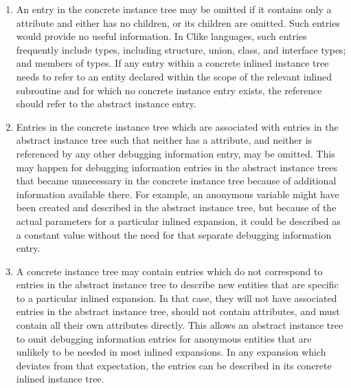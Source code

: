 \begin{enumerate}[1. ]
\item An entry in the concrete instance tree may be omitted if
it contains only a 
 attribute and either
has no children, or its children are omitted. Such entries
would provide no useful information. In C\dash like languages,
such entries frequently include types, including structure,
union, class, and interface types; and members of types. If any
entry within a concrete inlined instance tree needs to refer
to an entity declared within the scope of the relevant inlined
subroutine and for which no concrete instance entry exists,
the reference should refer to the abstract instance entry.

\item Entries in the concrete instance tree which are associated
with entries in the abstract instance tree such that neither
has a  attribute,
and neither is referenced by
any other debugging information entry, may be omitted. This
may happen for debugging information entries in the abstract
instance trees that became unnecessary in the concrete instance
tree because of additional information available there. For
example, an anonymous variable might have been created and
described in the abstract instance tree, but because of
the actual parameters for a particular inlined expansion,
it could be described as a constant value without the need
for that separate debugging information entry.

\item A concrete instance tree may contain entries which do
not correspond to entries in the abstract instance tree
to describe new entities that are specific to a particular
inlined expansion. In that case, they will not have associated
entries in the abstract instance tree, should not contain
 attributes, and must contain all their
own attributes directly. This allows an abstract instance tree
to omit debugging information entries for anonymous entities
that are unlikely to be needed in most inlined expansions. In
any expansion which deviates from that expectation, the
entries can be described in its concrete inlined instance tree.

\end{enumerate}

